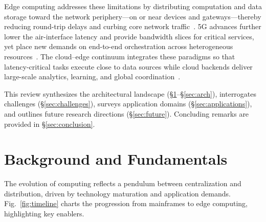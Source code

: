 \documentclass[conference]{IEEEtran}
\begin{document}
Edge computing addresses these limitations by distributing computation and data storage toward the network periphery---on or near devices and gateways---thereby reducing round-trip delays and curbing core network traffic~\cite{Shi2016IoTJ,Satya2017Emergence}. 5G advances further lower the air-interface latency and provide bandwidth slices for critical services, yet place new demands on end-to-end orchestration across heterogeneous resources~\cite{Mao2017MEC,Mach2017MEC}. The cloud--edge continuum integrates these paradigms so that latency-critical tasks execute close to data sources while cloud backends deliver large-scale analytics, learning, and global coordination~\cite{Varghese2018NextGen,Chiang2016FogIoT}.

This review synthesizes the architectural landscape (\S\ref{sec:background}--\S\ref{sec:arch}), interrogates challenges (\S\ref{sec:challenges}), surveys application domains (\S\ref{sec:applications}), and outlines future research directions (\S\ref{sec:future}). Concluding remarks are provided in \S\ref{sec:conclusion}.

\section{Background and Fundamentals}\label{sec:background}
The evolution of computing reflects a pendulum between centralization and distribution, driven by technology maturation and application demands. Fig.~\ref{fig:timeline} charts the progression from mainframes to edge computing, highlighting key enablers.
\end{document}
